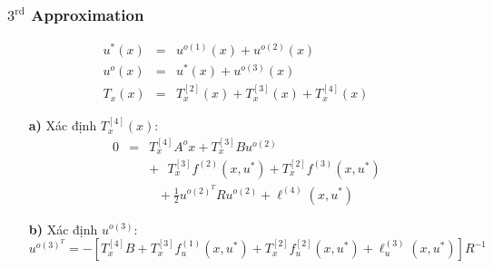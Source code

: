 \documentclass[12pt,a4paper]{report}
\begin{document}
\subsubsection{$3^{\text{rd}}$ Approximation}
\begin{eqnarray}
	u^*(x) &=& u^{o(1)}(x) + u^{o(2)}(x) \nonumber \\ u^o(x) &=&u^*(x) + u^{o(3)}(x) \nonumber \\ T_x(x) &=& T_x^{[2]}(x) + T_x^{[3]}(x) + T_x^{[4]}(x) \nonumber
\end{eqnarray}
\begin{itemize}
	\item[\textbf{a)}] Xác định $T_x^{[4]}(x)$: \begin{eqnarray}
		0 &=& T_x^{[4]}A^ox + T_x^{[3]}Bu^{o(2)} \nonumber \\ && + \text{ }T_x^{[3]}f^{(2)}(x, u^*) + T_x^{[2]}f^{(3)}(x, u^*) \nonumber \\ && \text{ } + \frac{1}{2}u^{o(2)^T}Ru^{o(2)} + \ell^{(4)}(x, u^*) \nonumber
	\end{eqnarray}
	\item[\textbf{b)}] Xác định $u^{o(3)}$: $$u^{o(3)^T} = -[T_x^{[4]}B + T_x^{[3]}f_u^{(1)}(x, u^*) + T_x^{[2]}f_u^{[2]}(x, u^*) + \ell_u^{(3)}(x, u^*)]R^{-1}$$
\end{itemize}
\end{document}
